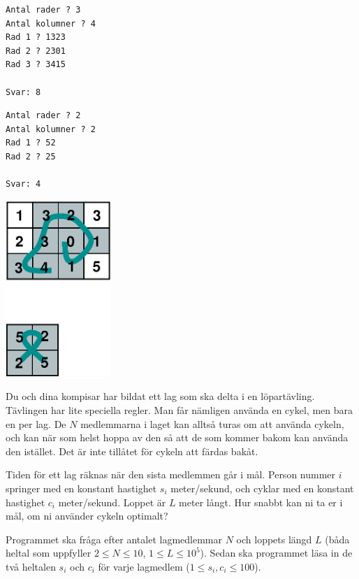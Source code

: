\begin{multicols}{2}
\begin{verbatim}
Antal rader ? 3
Antal kolumner ? 4
Rad 1 ? 1323
Rad 2 ? 2301
Rad 3 ? 3415

Svar: 8
\end{verbatim}



\begin{verbatim}
Antal rader ? 2
Antal kolumner ? 2
Rad 1 ? 52
Rad 2 ? 25

Svar: 4
\end{verbatim}

\vfill\columnbreak
\includegraphics[width=0.3\textwidth]{planetbackefig.eps}

\end{multicols}


\newpage
{}

Du och dina kompisar har bildat ett lag som ska delta i en löpartävling. Tävlingen har lite speciella regler.
Man får nämligen använda en cykel, men bara en per lag. De $N$ medlemmarna i laget kan alltså turas om att använda cykeln, och kan
när som helst hoppa av den så att de som kommer bakom kan använda den istället. Det är inte tillåtet för cykeln att färdas bakåt.

Tiden för ett lag räknas när den sista medlemmen går i mål. Person nummer $i$ springer med en
konstant hastighet $s_i$ meter/sekund, och cyklar med en konstant hastighet $c_i$ meter/sekund. Loppet är $L$ meter långt.
Hur snabbt kan ni ta er i mål, om ni använder cykeln optimalt?

Programmet ska fråga efter antalet lagmedlemmar $N$ och loppets längd $L$ (båda heltal som uppfyller $2 \leq N \leq 10$, $1 \leq L \leq 10^5$).
Sedan ska programmet läsa in de två heltalen $s_i$ och $c_i$ för varje lagmedlem ($1 \leq s_i, c_i \leq 100$).

